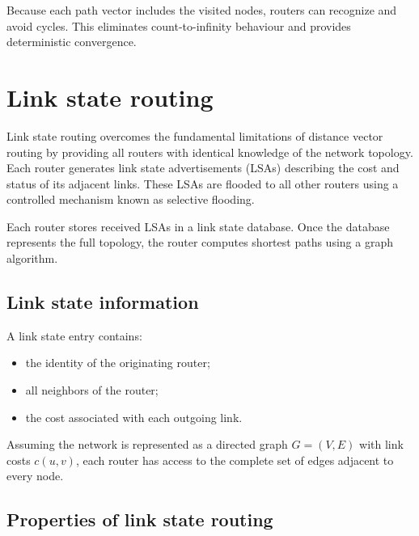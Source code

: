 Because each path vector includes the visited nodes, routers can recognize and avoid cycles. This eliminates count-to-infinity behaviour and provides deterministic convergence.

\section{Link state routing}

Link state routing overcomes the fundamental limitations of distance vector routing by providing all routers with identical knowledge of the network topology. Each router generates link state advertisements (LSAs) describing the cost and status of its adjacent links. These LSAs are flooded to all other routers using a controlled mechanism known as selective flooding.

\begin{center}
\end{center}

Each router stores received LSAs in a link state database. Once the database represents the full topology, the router computes shortest paths using a graph algorithm.

\subsection{Link state information}

A link state entry contains:

\begin{itemize}
\item the identity of the originating router;
\item all neighbors of the router;
\item the cost associated with each outgoing link.
\end{itemize}

\begin{center}
\end{center}


Assuming the network is represented as a directed graph $G = (V, E)$ with link costs $c(u,v)$, each router has access to the complete set of edges adjacent to every node.


\subsection{Properties of link state routing}

